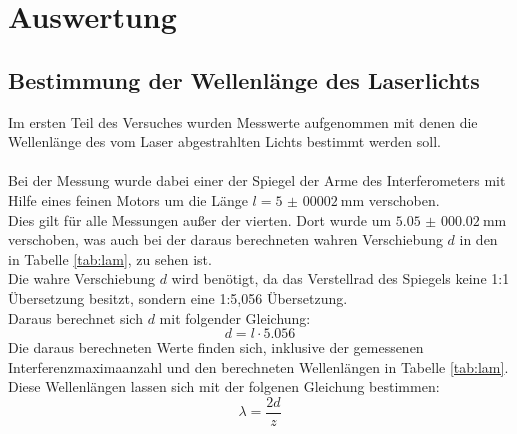 \newpage
\section{Auswertung}

\subsection{Bestimmung der Wellenlänge des Laserlichts}

\noindent Im ersten Teil des Versuches wurden Messwerte aufgenommen mit denen die Wellenlänge des vom Laser abgestrahlten Lichts bestimmt werden soll.\\\\
Bei der Messung wurde dabei einer der Spiegel der Arme des Interferometers mit Hilfe eines feinen Motors um die Länge $l=\SI{5(00002)}{\milli\metre}$ verschoben.\\
Dies gilt für alle Messungen außer der vierten. Dort wurde um $\SI{5.05(00002)}{\milli\metre}$ verschoben, was auch bei der daraus berechneten wahren Verschiebung $d$ in den in Tabelle \ref{tab:lam}, zu sehen ist.\\
Die wahre Verschiebung $d$ wird benötigt, da das Verstellrad des Spiegels keine 1:1 Übersetzung besitzt, sondern eine 1:5,056 Übersetzung.\\
Daraus berechnet sich $d$ mit folgender Gleichung:
\begin{equation*}
    d=l \cdot 5.056
\end{equation*}
\noindent
Die daraus berechneten Werte finden sich, inklusive der gemessenen Interferenzmaximaanzahl und den berechneten Wellenlängen in Tabelle \ref{tab:lam}.\\
Diese Wellenlängen lassen sich mit der folgenen Gleichung bestimmen:
\begin{equation*}
    \lambda=\frac{2d}{z}
\end{equation*}



